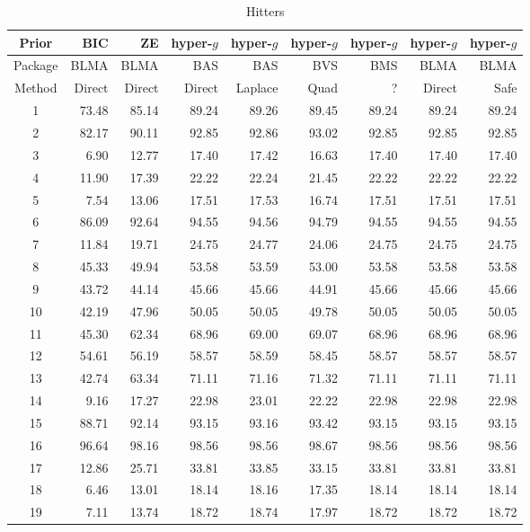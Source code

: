 \documentclass{article}[12pt]
\begin{document}
\begin{table}[ht]
	\centering
	{\small 	
	\begin{tabular}{c|r|r|rrrrrr}
		Prior   & BIC    & ZE     & hyper-$g$ & hyper-$g$ & hyper-$g$  & hyper-$g$ & hyper-$g$ & hyper-$g$ \\
		\hline 
		Package & BLMA   & BLMA   & BAS       & BAS       & BVS        & BMS       & BLMA      & BLMA       \\
		\hline 
		Method  & Direct & Direct & Direct    & Laplace   & Quad & ?         & Direct    & Safe      \\ 
		\hline
		1 & 73.48 & 85.14 & 89.24 & 89.26 & 89.45 & 89.24 & 89.24 & 89.24 \\ 
		2 & 82.17 & 90.11 & 92.85 & 92.86 & 93.02 & 92.85 & 92.85 & 92.85 \\ 
		3 & 6.90 & 12.77 & 17.40 & 17.42 & 16.63 & 17.40 & 17.40 & 17.40 \\ 
		4 & 11.90 & 17.39 & 22.22 & 22.24 & 21.45 & 22.22 & 22.22 & 22.22 \\ 
		5 & 7.54 & 13.06 & 17.51 & 17.53 & 16.74 & 17.51 & 17.51 & 17.51 \\ 
		6 & 86.09 & 92.64 & 94.55 & 94.56 & 94.79 & 94.55 & 94.55 & 94.55 \\ 
		7 & 11.84 & 19.71 & 24.75 & 24.77 & 24.06 & 24.75 & 24.75 & 24.75 \\ 
		8 & 45.33 & 49.94 & 53.58 & 53.59 & 53.00 & 53.58 & 53.58 & 53.58 \\ 
		9 & 43.72 & 44.14 & 45.66 & 45.66 & 44.91 & 45.66 & 45.66 & 45.66 \\ 
		10 & 42.19 & 47.96 & 50.05 & 50.05 & 49.78 & 50.05 & 50.05 & 50.05 \\ 
		11 & 45.30 & 62.34 & 68.96 & 69.00 & 69.07 & 68.96 & 68.96 & 68.96 \\ 
		12 & 54.61 & 56.19 & 58.57 & 58.59 & 58.45 & 58.57 & 58.57 & 58.57 \\ 
		13 & 42.74 & 63.34 & 71.11 & 71.16 & 71.32 & 71.11 & 71.11 & 71.11 \\ 
		14 & 9.16 & 17.27 & 22.98 & 23.01 & 22.22 & 22.98 & 22.98 & 22.98 \\ 
		15 & 88.71 & 92.14 & 93.15 & 93.16 & 93.42 & 93.15 & 93.15 & 93.15 \\ 
		16 & 96.64 & 98.16 & 98.56 & 98.56 & 98.67 & 98.56 & 98.56 & 98.56 \\ 
		17 & 12.86 & 25.71 & 33.81 & 33.85 & 33.15 & 33.81 & 33.81 & 33.81 \\ 
		18 & 6.46 & 13.01 & 18.14 & 18.16 & 17.35 & 18.14 & 18.14 & 18.14 \\ 
		19 & 7.11 & 13.74 & 18.72 & 18.74 & 17.97 & 18.72 & 18.72 & 18.72 \\ 
		\hline
	\end{tabular}
}
	\caption{Hitters}
	\label{tab:HittersResults1}
\end{table}
\end{document}
